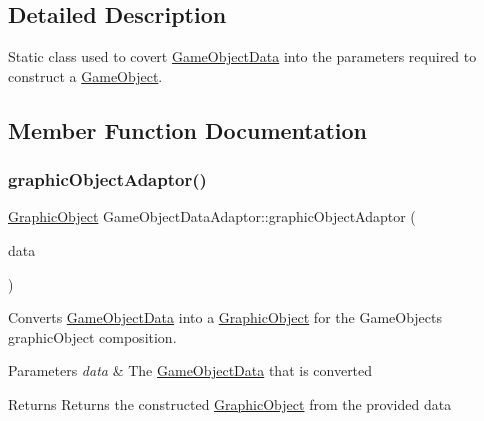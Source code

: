 \subsection{Detailed Description}
Static class used to covert \hyperlink{struct_game_object_data}{Game\+Object\+Data} into the parameters required to construct a \hyperlink{class_game_object}{Game\+Object}. 

\subsection{Member Function Documentation}
\mbox{\label{class_game_object_data_adaptor_aecb0cb3d75f42cf440a1fe23ccf81324}} 
\subsubsection{\texorpdfstring{graphic\+Object\+Adaptor()}{graphicObjectAdaptor()}}
{\footnotesize\ttfamily \hyperlink{class_graphic_object}{Graphic\+Object} Game\+Object\+Data\+Adaptor\+::graphic\+Object\+Adaptor (\begin{DoxyParamCaption}\item[{const \hyperlink{struct_game_object_data}{Game\+Object\+Data} \&}]{data }\end{DoxyParamCaption})\hspace{0.3cm}{\ttfamily [static]}}



Converts \hyperlink{struct_game_object_data}{Game\+Object\+Data} into a \hyperlink{class_graphic_object}{Graphic\+Object} for the Game\+Objects graphic\+Object composition. 


\begin{DoxyParams}{Parameters}
{\em data} & The \hyperlink{struct_game_object_data}{Game\+Object\+Data} that is converted \\
\hline
\end{DoxyParams}
\begin{DoxyReturn}{Returns}
Returns the constructed \hyperlink{class_graphic_object}{Graphic\+Object} from the provided data 
\end{DoxyReturn}
\mbox{\label{class_game_object_data_adaptor_a5ed602ccf6cb6b189dde62c037af59ad}} 
